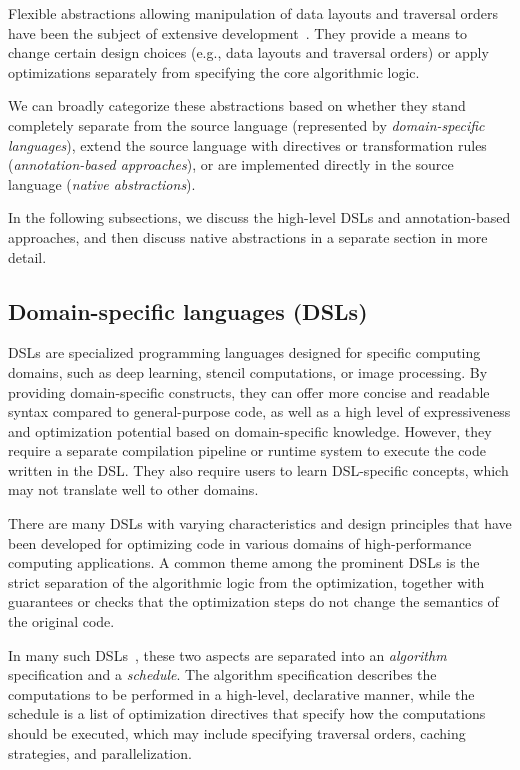 Flexible abstractions allowing manipulation of data layouts and traversal orders have been the subject of extensive development~\cite{ragan2013halide,trott2022mdspan,trott2021kokkos,beckingsale2019raja}. They provide a means to change certain design choices (e.g., data layouts and traversal orders) or apply optimizations separately from specifying the core algorithmic logic.

We can broadly categorize these abstractions based on whether they stand completely separate from the source language (represented by \emph{domain-specific languages}), extend the source language with directives or transformation rules (\emph{annotation-based approaches}), or are implemented directly in the source language (\emph{native abstractions}).

In the following subsections, we discuss the high-level DSLs and annotation-based approaches, and then discuss native abstractions in a separate section in more detail.


\subsection{Domain-specific languages (DSLs)}\label{sec:dsl}

DSLs are specialized programming languages designed for specific computing domains, such as deep learning, stencil computations, or image processing. By providing domain-specific constructs, they can offer more concise and readable syntax compared to general-purpose \cpp code, as well as a high level of expressiveness and optimization potential based on domain-specific knowledge. However, they require a separate compilation pipeline or runtime system to execute the code written in the DSL. They also require users to learn DSL-specific concepts, which may not translate well to other domains.

There are many DSLs with varying characteristics and design principles that have been developed for optimizing code in various domains of high-performance computing applications. A common theme among the prominent DSLs is the strict separation of the algorithmic logic from the optimization, together with guarantees or checks that the optimization steps do not change the semantics of the original code.

In many such DSLs~\cite{ragan2013halide,baghdadi2019tiramisu,chen2018tvm,zhang2018graphit}, these two aspects are separated into an \textit{algorithm} specification and a \textit{schedule}. The algorithm specification describes the computations to be performed in a high-level, declarative manner, while the schedule is a list of optimization directives that specify how the computations should be executed, which may include specifying traversal orders, caching strategies, and parallelization.

